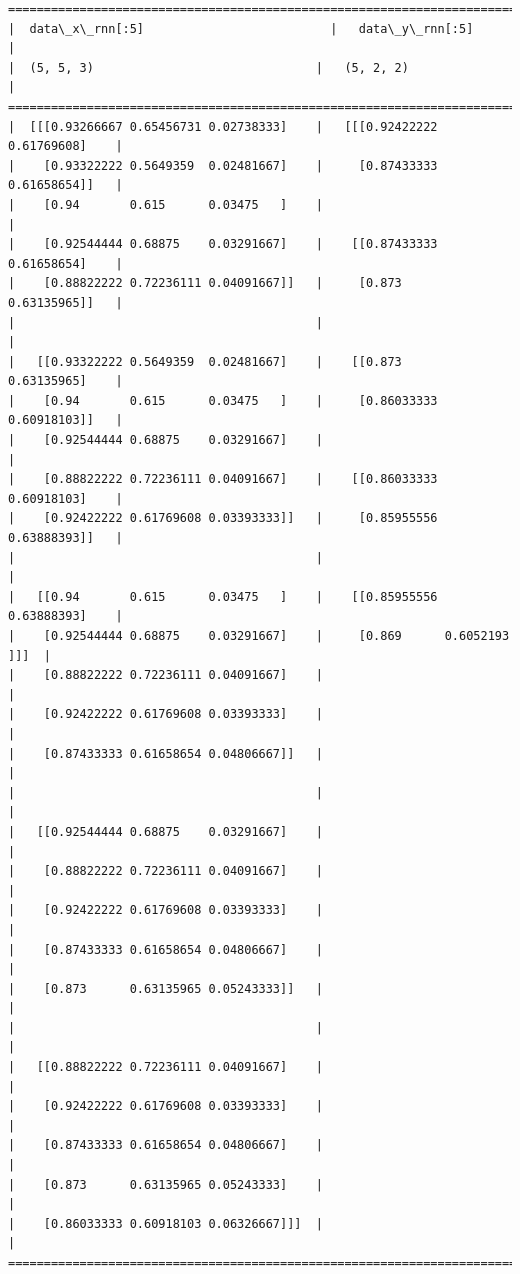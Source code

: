 \documentclass[11pt]{article}
\begin{document}
\begin{Verbatim}[commandchars=\\\{\}]
=============================================================================
|  data\_x\_rnn[:5]                          |   data\_y\_rnn[:5]               |
|  (5, 5, 3)                               |   (5, 2, 2)                    |
=============================================================================
|  [[[0.93266667 0.65456731 0.02738333]    |   [[[0.92422222 0.61769608]    |
|    [0.93322222 0.5649359  0.02481667]    |     [0.87433333 0.61658654]]   |
|    [0.94       0.615      0.03475   ]    |                                |
|    [0.92544444 0.68875    0.03291667]    |    [[0.87433333 0.61658654]    |
|    [0.88822222 0.72236111 0.04091667]]   |     [0.873      0.63135965]]   |
|                                          |                                |
|   [[0.93322222 0.5649359  0.02481667]    |    [[0.873      0.63135965]    |
|    [0.94       0.615      0.03475   ]    |     [0.86033333 0.60918103]]   |
|    [0.92544444 0.68875    0.03291667]    |                                |
|    [0.88822222 0.72236111 0.04091667]    |    [[0.86033333 0.60918103]    |
|    [0.92422222 0.61769608 0.03393333]]   |     [0.85955556 0.63888393]]   |
|                                          |                                |
|   [[0.94       0.615      0.03475   ]    |    [[0.85955556 0.63888393]    |
|    [0.92544444 0.68875    0.03291667]    |     [0.869      0.6052193 ]]]  |
|    [0.88822222 0.72236111 0.04091667]    |                                |
|    [0.92422222 0.61769608 0.03393333]    |                                |
|    [0.87433333 0.61658654 0.04806667]]   |                                |
|                                          |                                |
|   [[0.92544444 0.68875    0.03291667]    |                                |
|    [0.88822222 0.72236111 0.04091667]    |                                |
|    [0.92422222 0.61769608 0.03393333]    |                                |
|    [0.87433333 0.61658654 0.04806667]    |                                |
|    [0.873      0.63135965 0.05243333]]   |                                |
|                                          |                                |
|   [[0.88822222 0.72236111 0.04091667]    |                                |
|    [0.92422222 0.61769608 0.03393333]    |                                |
|    [0.87433333 0.61658654 0.04806667]    |                                |
|    [0.873      0.63135965 0.05243333]    |                                |
|    [0.86033333 0.60918103 0.06326667]]]  |                                |
=============================================================================

    \end{Verbatim}
\end{document}
